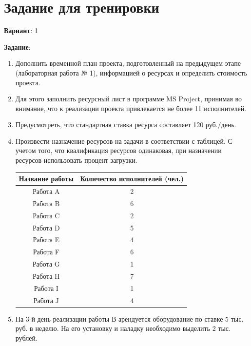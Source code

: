 \chapter{Задание для тренировки}

\textbf{Вариант}: 1

\textbf{Задание}: 

\begin{enumerate}
	\item Дополнить временной план проекта, подготовленный на предыдущем этапе
	(лабораторная работа № 1), информацией о ресурсах и определить стоимость
	проекта.
	\item Для этого заполнить ресурсный лист в программе MS Project, принимая во
	внимание, что к реализации проекта привлекается не более 11 исполнителей.
	\item Предусмотреть, что стандартная ставка ресурса составляет 120 руб./день.
	\item Произвести назначение ресурсов на задачи в соответствии с таблицей. С учетом
	того, что квалификация ресурсов одинаковая, при назначении ресурсов
	использовать процент загрузки.

	\begin{table}[H]
		\begin{center}
			\begin{tabular}{|c|c|}
				\hline
				\bfseries Название работы & \bfseries Количество исполнителей (чел.) \\\hline
				Работа A & 2 \\\hline
				Работа B & 6 \\\hline
				Работа C & 2 \\\hline
				Работа D & 5 \\\hline
				Работа E & 4 \\\hline
				Работа F & 6 \\\hline
				Работа G & 1 \\\hline
				Работа H & 7 \\\hline
				Работа I & 1 \\\hline
				Работа J & 4 \\
				\hline
			\end{tabular}
		\end{center}
	\end{table}

	\item На 3-й день реализации работы В арендуется оборудование по ставке 5 тыс. руб.
	в неделю. На его установку и наладку необходимо выделить 2 тыс. рублей.

\end{enumerate}

